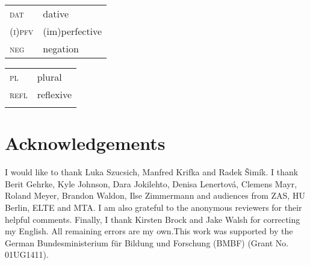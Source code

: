 \documentclass[output=paper,
  modfonts,
  newtxmath,
  hidelinks
		  ]{langscibook}
\begin{document}
\begin{tabularx}{.45\textwidth}{lQ}
\textsc{dat} & dative \\
\textsc{(i)pfv} & (im)perfective\\
\textsc{neg} & negation\\
\end{tabularx}
\begin{tabularx}{.45\textwidth}{lQ}
\textsc{pl}&plural\\
\textsc{refl}&reflexive\\
{}&{}\\
\end{tabularx}

 \section*{Acknowledgements}
I would like to thank Luka Szucsich, Manfred Krifka and Radek \v{S}imík. I thank Berit Gehrke, Kyle Johnson, Dara Jokilehto, Denisa Lenertová, Clemens Mayr, Roland Meyer, Brandon Waldon, Ilse Zimmermann and audiences from ZAS, HU Berlin, ELTE and MTA. I am also grateful to the anonymous reviewers for their helpful comments. Finally, I thank Kirsten Brock and Jake Walsh for correcting my English. All remaining errors are my own.\newline This work was supported by the German Bundesministerium für Bildung und Forschung (BMBF) (Grant No. 01UG1411).

\sloppy
\printbibliography[heading=subbibliography,notkeyword=this]
\end{document}
